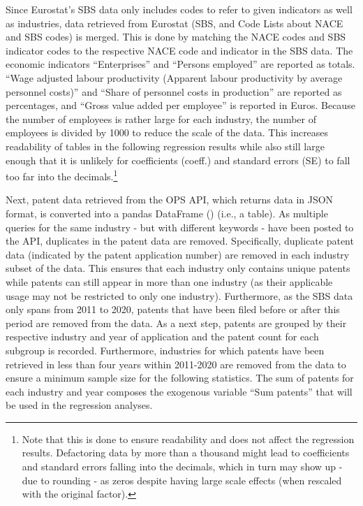 \documentclass[
  11,
  a4paperpaper,
]{article}
\begin{document}
Since Eurostat's SBS data only includes codes to refer to given
indicators as well as industries, data retrieved from Eurostat (SBS, and
Code Lists about NACE and SBS codes) is merged. This is done by matching
the NACE codes and SBS indicator codes to the respective NACE code and
indicator in the SBS data. The economic indicators ``Enterprises'' and
``Persons employed'' are reported as totals. ``Wage adjusted labour
productivity (Apparent labour productivity by average personnel costs)''
and ``Share of personnel costs in production'' are reported as
percentages, and ``Gross value added per employee'' is reported in
Euros. Because the number of employees is rather large for each
industry, the number of employees is divided by 1000 to reduce the scale
of the data. This increases readability of tables in the following
regression results while also still large enough that it is unlikely for
coefficients (coeff.) and standard errors (SE) to fall too far into the
decimals.\footnote{Note that this is done to ensure readability and does
  not affect the regression results. Defactoring data by more than a
  thousand might lead to coefficients and standard errors falling into
  the decimals, which in turn may show up - due to rounding - as zeros
  despite having large scale effects (when rescaled with the original
  factor).\label{note3}}

Next, patent data retrieved from the OPS API, which returns data in JSON
format, is converted into a pandas DataFrame
() (i.e., a table). As multiple queries for
the same industry - but with different keywords - have been posted to
the API, duplicates in the patent data are removed. Specifically,
duplicate patent data (indicated by the patent application number) are
removed in each industry subset of the data. This ensures that each
industry only contains unique patents while patents can still appear in
more than one industry (as their applicable usage may not be restricted
to only one industry). Furthermore, as the SBS data only spans from 2011
to 2020, patents that have been filed before or after this period are
removed from the data. As a next step, patents are grouped by their
respective industry and year of application and the patent count for
each subgroup is recorded. Furthermore, industries for which patents
have been retrieved in less than four years within 2011-2020 are removed
from the data to ensure a minimum sample size for the following
statistics. The sum of patents for each industry and year composes the
exogenous variable ``Sum patents'' that will be used in the regression
analyses.
\end{document}
